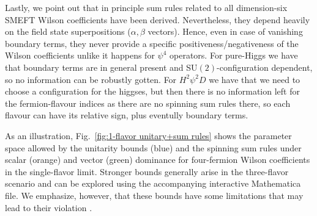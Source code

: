 \documentclass[a4paper,11pt]{article}
\begin{document}
Lastly, we point out that in principle sum rules related to all dimension-six SMEFT Wilson coefficients have been derived. Nevertheless, they depend heavily on the field state superpositions ($\alpha,\beta$ vectors). Hence, even in case of vanishing boundary terms, they never provide a specific positiveness/negativeness of the Wilson coefficients unlike it happens for $\psi^4$ operators. For pure-Higgs we have that boundary terms are in general present and SU$(2)$-configuration dependent, so no information can be robustly gotten. For $H^2\psi^2D$ we have that we need to choose a configuration for the higgses, but then there is no information left for the fermion-flavour indices as there are no spinning sum rules there, so each flavour can have its relative sign, plus eventully boundary terms.

As an illustration, Fig.~\ref{fig:1-flavor unitary+sum rules} shows the parameter space allowed by the unitarity bounds (blue) and the spinning sum rules under scalar (orange) and vector (green) dominance for four-fermion Wilson coefficients in the single-flavor limit. 
Stronger bounds generally arise in the three-flavor scenario and can be explored using the accompanying interactive Mathematica file.
We emphasize, however, that these bounds have some limitations that may lead to their violation \cite{Remmen:2020uze,Remmen:2022orj,Azatov:2021ygj,Gu:2020thj}.
\end{document}
